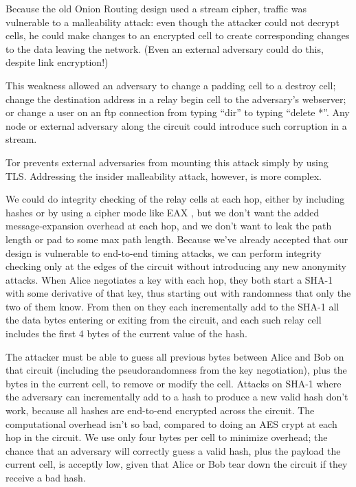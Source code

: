 \documentclass[times,10pt,twocolumn]{article}
\begin{document}

Because the old Onion Routing design used a stream cipher, traffic was
vulnerable to a malleability attack: even though the attacker could not
decrypt cells, he could make changes to an encrypted
cell to create corresponding changes to the data leaving the network.
(Even an external adversary could do this, despite link encryption!)

This weakness allowed an adversary to change a padding cell to a destroy
cell; change the destination address in a relay begin cell to the
adversary's webserver; or change a user on an ftp connection from
typing ``dir'' to typing ``delete *''. Any node or external adversary
along the circuit could introduce such corruption in a stream.

Tor prevents external adversaries from mounting this attack simply by
using TLS. Addressing the insider malleability attack, however, is
more complex.

We could do integrity checking of the relay cells at each hop, either
by including hashes or by using a cipher mode like EAX \cite{eax},
but we don't want the added message-expansion overhead at each hop, and
we don't want to leak the path length or pad to some max path length.
Because we've already accepted that our design is vulnerable to end-to-end
timing attacks, we can perform integrity checking only at the edges of
the circuit without introducing any new anonymity attacks. When Alice
negotiates a key
with each hop, they both start a SHA-1 with some derivative of that key,
thus starting out with randomness that only the two of them know. From
then on they each incrementally add to the SHA-1 all the data bytes
entering or exiting from the circuit, and each such relay cell includes
the first 4 bytes of the current value of the hash.

The attacker must be able to guess all previous bytes between Alice
and Bob on that circuit (including the pseudorandomness from the key
negotiation), plus the bytes in the current cell, to remove or modify the
cell. Attacks on SHA-1 where the adversary can incrementally add to a
hash to produce a new valid hash don't work,
because all hashes are end-to-end encrypted across the circuit.
The computational overhead isn't so bad, compared to doing an AES
crypt at each hop in the circuit. We use only four bytes per cell to
minimize overhead; the chance that an adversary will correctly guess a
valid hash, plus the payload the current cell, is acceptly low, given
that Alice or Bob tear down the circuit if they receive a bad hash.
\end{document}
